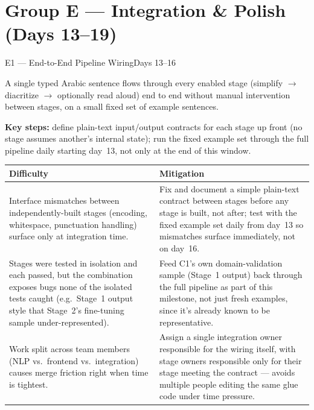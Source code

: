 \documentclass[11pt,a4paper]{article}
\begin{document}
\newpage
\section{Group E --- Integration \& Polish (Days 13--19)}

\begin{milestonehead}{E1 --- End-to-End Pipeline Wiring}{Days 13--16}
\begin{goalbox}
A single typed Arabic sentence flows through every enabled stage (simplify
$\to$ diacritize $\to$ optionally read aloud) end to end without manual
intervention between stages, on a small fixed set of example sentences.
\end{goalbox}

\textbf{Key steps:} define plain-text input/output contracts for each stage
up front (no stage assumes another's internal state); run the fixed example
set through the full pipeline daily starting day~13, not only at the end of
this window.

\begin{center}
\small
\begin{tabular}{@{}p{6.3cm}p{6.9cm}@{}}
\toprule
\textbf{Difficulty} & \textbf{Mitigation} \\
\midrule
Interface mismatches between independently-built stages (encoding,
whitespace, punctuation handling) surface only at integration time. &
Fix and document a simple plain-text contract between stages before any
stage is built, not after; test with the fixed example set daily from
day~13 so mismatches surface immediately, not on day~16. \\
\addlinespace
Stages were tested in isolation and each passed, but the combination
exposes bugs none of the isolated tests caught (e.g.\ Stage~1 output style
that Stage~2's fine-tuning sample under-represented). & Feed C1's own
domain-validation sample (Stage~1 output) back through the full pipeline
as part of this milestone, not just fresh examples, since it's already
known to be representative. \\
\addlinespace
Work split across team members (NLP vs.\ frontend vs.\ integration) causes
merge friction right when time is tightest. & Assign a single integration
owner responsible for the wiring itself, with stage owners responsible only
for their stage meeting the contract --- avoids multiple people editing the
same glue code under time pressure. \\
\bottomrule
\end{tabular}
\end{center}
\end{milestonehead}
\end{document}
